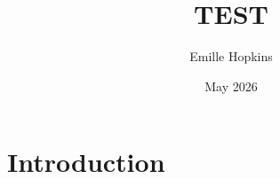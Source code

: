 \documentclass{article}
\title{TEST}
\author{Emille Hopkins}
\date{May 2026}
\begin{document}
\maketitle

\section{Introduction}
\end{document}
